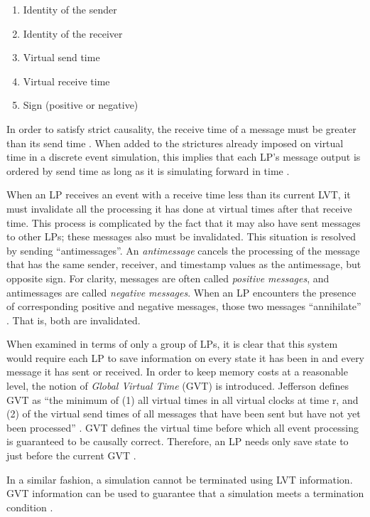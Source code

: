 \documentclass[11pt]{book}
\begin{document}
\begin{enumerate}
  \item Identity of the sender
  \item Identity of the receiver
  \item Virtual send time
  \item Virtual receive time
  \item Sign (positive or negative)
\end{enumerate}

In order to satisfy strict causality, the receive time of a message must be
greater than its send time \cite{lamport-78}. When added to the strictures
already imposed on virtual time in a discrete event simulation, this implies
that each LP's message output is ordered by send time as long as it is
simulating forward in time \cite{jefferson-85}.

When an LP receives an event with a receive time less than its current LVT, it
must invalidate all the processing it has done at virtual times after that
receive time. This process is complicated by the fact that it may also have sent
messages to other LPs; these messages also must be invalidated. This situation
is resolved by sending ``antimessages''. An \textit{antimessage} cancels the
processing of the message that has the same sender, receiver, and timestamp
values as the antimessage, but opposite sign. For clarity, messages are often
called \textit{positive messages}, and antimessages are called \textit{negative
  messages}. When an LP encounters the presence of corresponding positive and
negative messages, those two messages ``annihilate'' \cite{jefferson-85}. That
is, both are invalidated.

When examined in terms of only a group of LPs, it is clear that this system would
require each LP to save information on every state it has been in and every
message it has sent or received. In order to keep memory costs at a reasonable
level, the notion of \textit{Global Virtual Time} (GVT) is introduced. Jefferson defines
GVT as ``the minimum of (1) all virtual times in all virtual clocks at time r,
and (2) of the virtual send times of all messages that have been sent but have
not yet been processed'' \cite{jefferson-85}. GVT defines the virtual time
before which all event processing is guaranteed to be causally
correct. Therefore, an LP needs only save state to just before the current GVT
\cite{fujimoto-89b}.

In a similar fashion, a simulation cannot be terminated using LVT
information. GVT information can be used to guarantee that a simulation meets a
termination condition \cite{jefferson-85}.
\end{document}
